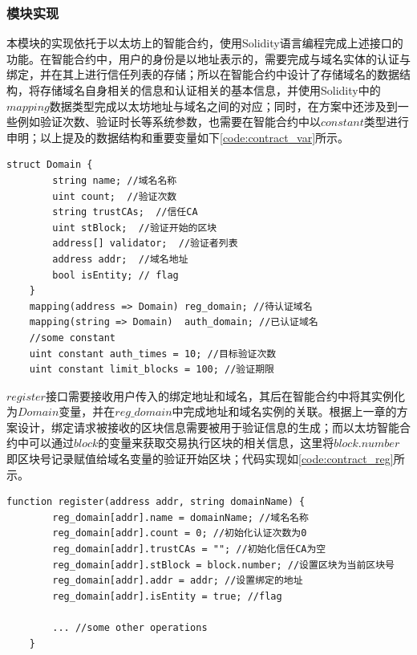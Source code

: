 

\subsubsection{模块实现}

本模块的实现依托于以太坊上的智能合约，使用Solidity语言编程完成上述接口的功能。在智能合约中，用户的身份是以地址表示的，需要完成与域名实体的认证与绑定，并在其上进行信任列表的存储；所以在智能合约中设计了存储域名的数据结构，将存储域名自身相关的信息和认证相关的基本信息，并使用Solidity中的$mapping$数据类型完成以太坊地址与域名之间的对应；同时，在方案中还涉及到一些例如验证次数、验证时长等系统参数，也需要在智能合约中以$constant$类型进行申明；以上提及的数据结构和重要变量如下\ref{code:contract_var}所示。

\renewcommand{\lstlistingname}{代码}
\begin{lstlisting}[caption={域名数据结构和重要变量}, label={code:contract_var}]
    struct Domain {
        string name; //域名名称
        uint count;  //验证次数
        string trustCAs;  //信任CA
        uint stBlock;  //验证开始的区块
        address[] validator;  //验证者列表
        address addr;  //域名地址
        bool isEntity; // flag 
    }
    mapping(address => Domain) reg_domain; //待认证域名
    mapping(string => Domain)  auth_domain; //已认证域名
    //some constant
    uint constant auth_times = 10; //目标验证次数
    uint constant limit_blocks = 100; //验证期限
\end{lstlisting}

$register$接口需要接收用户传入的绑定地址和域名，其后在智能合约中将其实例化为$Domain$变量，并在$reg\_domain$中完成地址和域名实例的关联。根据上一章的方案设计，绑定请求被接收的区块信息需要被用于验证信息的生成；而以太坊智能合约中可以通过$block$的变量来获取交易执行区块的相关信息，这里将$block.number$即区块号记录赋值给域名变量的验证开始区块；代码实现如\ref{code:contract_reg}所示。

\renewcommand{\lstlistingname}{代码}
\begin{lstlisting}[caption={register接口部分实现}, label={code:contract_reg}]
    function register(address addr, string domainName) { 
        reg_domain[addr].name = domainName; //域名名称
        reg_domain[addr].count = 0; //初始化认证次数为0
        reg_domain[addr].trustCAs = ""; //初始化信任CA为空
        reg_domain[addr].stBlock = block.number; //设置区块为当前区块号
        reg_domain[addr].addr = addr; //设置绑定的地址
        reg_domain[addr].isEntity = true; //flag
        
        ... //some other operations
    }
\end{lstlisting}

